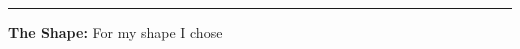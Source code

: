 \documentclass[12pt]{amsart}
\begin{document}

\smallskip

\hrule


\bigskip

{\bf The Shape:}  For my shape I chose
\end{document}
